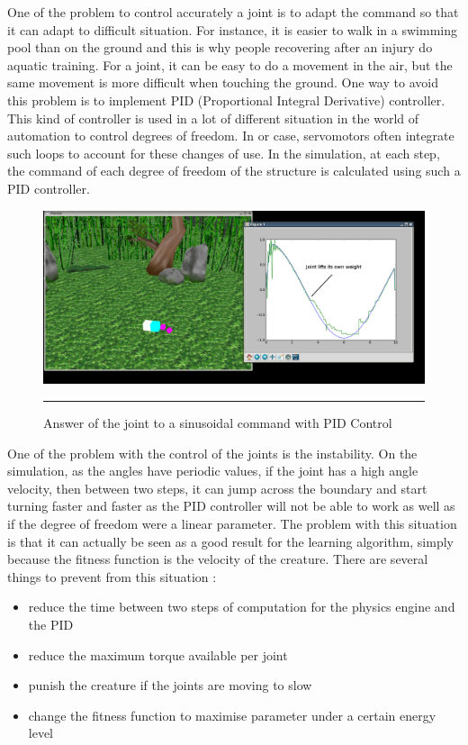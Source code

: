 One of the problem to control accurately a joint is to adapt the command so that it can adapt to difficult situation. For instance, it is easier to walk in a swimming pool than on the ground and this is why people recovering after an injury do aquatic training. For a joint, it can be easy to do a movement in the air, but the same movement is more difficult when touching the ground. One way to avoid this problem is to implement PID (Proportional Integral Derivative) controller. This kind of controller is used in a lot of different situation in the world of automation to control degrees of freedom. In or case, servomotors often integrate such loops to account for these changes of use. In the simulation, at each step, the command of each degree of freedom of the structure is calculated using such a PID controller. 

\begin{figure}[htbp]
    \centering
    \includegraphics[scale=0.3]{Figures/servomotor.png}
    \rule{35em}{0.5pt}
    \caption[Answer of a joint to a sinusoidal command]{Answer of the joint to a sinusoidal command with PID Control}
    \label{fig:Snake}
\end{figure}

One of the problem with the control of the joints is the instability. On the simulation, as the angles have periodic values, if the joint has a high angle velocity, then between two steps, it can jump across the boundary and start turning faster and faster as the PID controller will not be able to work as well as if the degree of freedom were a linear parameter. The problem with this situation is that it can actually be seen as a good result for the learning algorithm, simply because the fitness function is the velocity of the creature. There are several things to prevent from this situation :

\begin{itemize}
    \item reduce the time between two steps of computation for the physics engine and the PID
    \item reduce the maximum torque available per joint
    \item punish the creature if the joints are moving to slow
    \item change the fitness function to maximise parameter under a certain energy level
\end{itemize}
        

